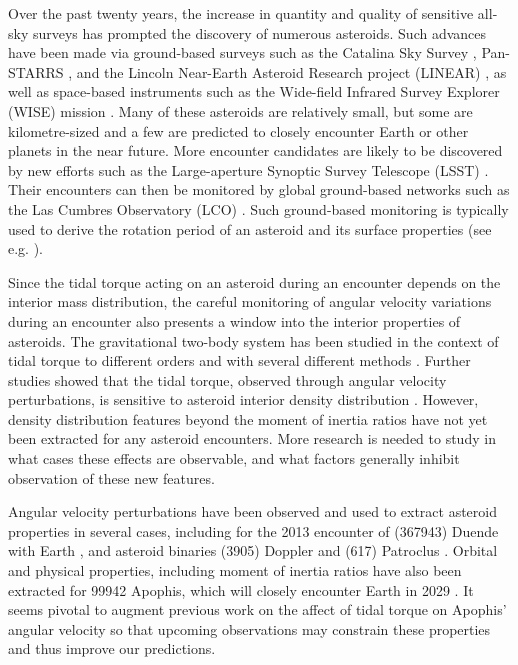\documentclass[fleqn,usenatbib]{mnras}
\begin{document}
Over the past twenty years, the increase in quantity and quality of sensitive all-sky surveys has prompted the discovery of numerous asteroids. Such advances have been made via ground-based surveys such as the Catalina Sky Survey \cite{larson1998catalina}, Pan-STARRS \cite{kaiser2002pan}, and the Lincoln Near-Earth Asteroid Research project (LINEAR) \cite{stokes2000lincoln}, as well as space-based instruments such as the Wide-field Infrared Survey Explorer (WISE) mission \cite{wright2010wide}. Many of these asteroids are relatively small, but some are kilometre-sized and a few are predicted to closely encounter Earth or other planets in the near future. More encounter candidates are likely to be discovered by new efforts such as the Large-aperture Synoptic Survey Telescope (LSST) \cite{tyson2002large}. Their encounters can then be monitored by global ground-based networks such as the Las Cumbres Observatory (LCO) \cite{brown2013cumbres}. Such ground-based monitoring is typically used to derive the rotation period of an asteroid and its surface properties (see e.g. \cite{10.1093/mnras/stab1252}).

Since the tidal torque acting on an asteroid during an encounter depends on the interior mass distribution, the careful monitoring of angular velocity variations during an encounter also presents a window into the interior properties of asteroids. The gravitational two-body system has
been studied in the context of tidal torque to different orders
and with several different methods \cite{paul88, SCHEERES2000106, ashenberg07, BOUE2009750, HouMar2017}. Further studies showed that the tidal torque, observed through angular velocity perturbations, is sensitive to asteroid interior density distribution \cite{Naidu_2015, Makarov2022ChaosOO, RICHARDSON199847, scheeres2004evolution}. However, density distribution features beyond the moment of inertia ratios have not yet been extracted for any asteroid encounters. More research is needed to study in what cases these effects are observable, and what
factors generally inhibit observation of these new features. 

Angular velocity perturbations have been observed and
used to extract asteroid properties in several cases, including
for the 2013 encounter of (367943) Duende with Earth \cite{MOSKOVITZ2020113519, benson2020spin}, and asteroid
binaries (3905) Doppler and (617) Patroclus \cite{DESCAMPS2020113726, BERTHIER2020113990}. Orbital and physical properties, including moment of inertia ratios have also been extracted for 99942 Apophis, which will closely encounter Earth in 2029 \cite{yu2014numerical, hirabayashi2021finite, valvano2022apophis, Lee2022Apophis}. It seems pivotal to augment previous work on the affect of tidal torque on Apophis' angular velocity \cite{souchay2014rotational, souchay2018changes} so that upcoming observations may constrain these properties and thus improve our predictions.
\end{document}
